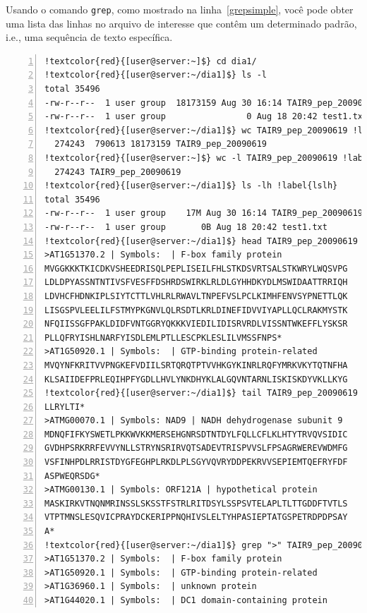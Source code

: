 \documentclass[letter,11pt]{book}
\begin{document}
Usando o comando \Verb+grep+, como mostrado na linha~\ref{grepsimple}, você pode obter uma lista das linhas no arquivo de interesse que contêm um determinado padrão, i.e., uma sequência de texto específica.

\begin{Verbatim}[commandchars=!\{\},numbers=left,firstnumber=last,label=Operações básicas com arquivos,frame=topline,fontsize=\scriptsize]
!textcolor{red}{[user@server:~]$} cd dia1/
!textcolor{red}{[user@server:~/dia1]$} ls -l
total 35496
-rw-r--r--  1 user group  18173159 Aug 30 16:14 TAIR9_pep_20090619 !label{tamanoarapep}
-rw-r--r--  1 user group                0 Aug 18 20:42 test1.txt
!textcolor{red}{[user@server:~/dia1]$} wc TAIR9_pep_20090619 !label{wc}
  274243  790613 18173159 TAIR9_pep_20090619
!textcolor{red}{[user@server:~]$} wc -l TAIR9_pep_20090619 !label{wcl}
  274243 TAIR9_pep_20090619
!textcolor{red}{[user@server:~/dia1]$} ls -lh !label{lslh}
total 35496
-rw-r--r--  1 user group    17M Aug 30 16:14 TAIR9_pep_20090619
-rw-r--r--  1 user group       0B Aug 18 20:42 test1.txt
!textcolor{red}{[user@server:~/dia1]$} head TAIR9_pep_20090619 !label{head10}
>AT1G51370.2 | Symbols:  | F-box family protein
MVGGKKKTKICDKVSHEEDRISQLPEPLISEILFHLSTKDSVRTSALSTKWRYLWQSVPG
LDLDPYASSNTNTIVSFVESFFDSHRDSWIRKLRLDLGYHHDKYDLMSWIDAATTRRIQH
LDVHCFHDNKIPLSIYTCTTLVHLRLRWAVLTNPEFVSLPCLKIMHFENVSYPNETTLQK
LISGSPVLEELILFSTMYPKGNVLQLRSDTLKRLDINEFIDVVIYAPLLQCLRAKMYSTK
NFQIISSGFPAKLDIDFVNTGGRYQKKKVIEDILIDISRVRDLVISSNTWKEFFLYSKSR
PLLQFRYISHLNARFYISDLEMLPTLLESCPKLESLILVMSSFNPS*
>AT1G50920.1 | Symbols:  | GTP-binding protein-related
MVQYNFKRITVVPNGKEFVDIILSRTQRQTPTVVHKGYKINRLRQFYMRKVKYTQTNFHA
KLSAIIDEFPRLEQIHPFYGDLLHVLYNKDHYKLALGQVNTARNLISKISKDYVKLLKYG
!textcolor{red}{[user@server:~/dia1]$} tail TAIR9_pep_20090619 !label{tail10}
LLRYLTI*
>ATMG00070.1 | Symbols: NAD9 | NADH dehydrogenase subunit 9
MDNQFIFKYSWETLPKKWVKKMERSEHGNRSDTNTDYLFQLLCFLKLHTYTRVQVSIDIC
GVDHPSRKRRFEVVYNLLSTRYNSRIRVQTSADEVTRISPVVSLFPSAGRWEREVWDMFG
VSFINHPDLRRISTDYGFEGHPLRKDLPLSGYVQVRYDDPEKRVVSEPIEMTQEFRYFDF
ASPWEQRSDG*
>ATMG00130.1 | Symbols: ORF121A | hypothetical protein
MASKIRKVTNQNMRINSSLSKSSTFSTRLRITDSYLSSPSVTELAPLTLTTGDDFTVTLS
VTPTMNSLESQVICPRAYDCKERIPPNQHIVSLELTYHPASIEPTATGSPETRDPDPSAY
A*
!textcolor{red}{[user@server:~/dia1]$} grep ">" TAIR9_pep_20090619 | head -n 4  !label{grepsimple}
>AT1G51370.2 | Symbols:  | F-box family protein
>AT1G50920.1 | Symbols:  | GTP-binding protein-related
>AT1G36960.1 | Symbols:  | unknown protein
>AT1G44020.1 | Symbols:  | DC1 domain-containing protein
\end{Verbatim} 
\end{document}
